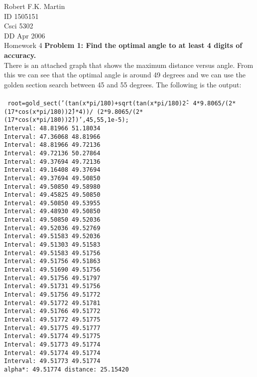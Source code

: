 \documentclass[11pt]{article}
\numberwithin{equation}{section}  %
\begin{document}


\noindent Robert F.K. Martin\\
ID 1505151\\
Csci 5302\\
DD Apr 2006\\
Homework 4
\hline
\vspace*{0.25in}
\noindent\textbf{Problem 1: Find the optimal angle to at least 4 digits of accuracy.}
\\
\noindent There is an attached graph that shows the maximum distance versus angle. From this we can see that the optimal angle is around 49 degrees and we can use the golden section search between 45 and 55 degrees. The following is the output:\\
\\
\texttt{
root=gold\_sect('(tan(x*pi/180)+sqrt(tan(x*pi/180)\^2-
     4*9.8065/(2*(17*cos(x*pi/180))\^2)*4))/
     (2*9.8065/(2*(17*cos(x*pi/180))\^2))',45,55,1e-5);\\
Interval: 48.81966 51.18034\\
Interval: 47.36068 48.81966\\
Interval: 48.81966 49.72136\\
Interval: 49.72136 50.27864\\
Interval: 49.37694 49.72136\\
Interval: 49.16408 49.37694\\
Interval: 49.37694 49.50850\\
Interval: 49.50850 49.58980\\
Interval: 49.45825 49.50850\\
Interval: 49.50850 49.53955\\
Interval: 49.48930 49.50850\\
Interval: 49.50850 49.52036\\
Interval: 49.52036 49.52769\\
Interval: 49.51583 49.52036\\
Interval: 49.51303 49.51583\\
Interval: 49.51583 49.51756\\
Interval: 49.51756 49.51863\\
Interval: 49.51690 49.51756\\
Interval: 49.51756 49.51797\\
Interval: 49.51731 49.51756\\
Interval: 49.51756 49.51772\\
Interval: 49.51772 49.51781\\
Interval: 49.51766 49.51772\\
Interval: 49.51772 49.51775\\
Interval: 49.51775 49.51777\\
Interval: 49.51774 49.51775\\
Interval: 49.51773 49.51774\\
Interval: 49.51774 49.51774\\
Interval: 49.51773 49.51774\\
alpha*: 49.51774 distance: 25.15420\\
}
\vspace*{0.25in}
\end{document}
